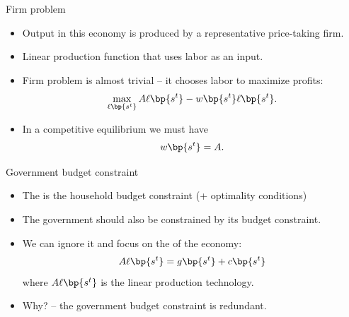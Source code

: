 \documentclass[11pt,xcolor={dvipsnames},hyperref={pdftex,pdfpagemode=UseNone,hidelinks,pdfdisplaydoctitle=true},usepdftitle=false]{beamer}
\begin{document}
    \begin{frame}{Firm problem}
        \begin{itemize}
            \item Output in this economy is produced by a representative price-taking firm.
            \item Linear production function that uses labor as an input.
            \item Firm problem is almost trivial -- it chooses labor to maximize profits:
            $$\max_{\ell\bp{s^t}} A\ell\bp{s^t} - w\bp{s^t} \ell \bp{s^t}.$$
            \item In a competitive equilibrium we must have
            $$ w\bp{s^t} = A.$$
        \end{itemize}
    \end{frame}
    \begin{frame}{Government budget constraint}
        \begin{itemize}
            \item The  is the household budget constraint (+ optimality conditions)
            \item The government should also be constrained by its budget constraint.
            \item We can ignore it and focus  on the  of the economy: 
            $$ A \ell\bp{s^t} = g\bp{s^t} + c\bp{s^t}$$
            where $A \ell\bp{s^t}$ is the linear production technology.
            \item Why?  -- the government budget constraint is redundant.
        \end{itemize}
    \end{frame}
    
\end{document}
